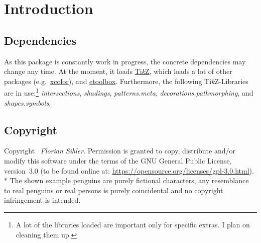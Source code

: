 \documentclass[parskip=half,english,numbers=noenddot,footnotes=nomultiple,oneside]{scrartcl}
\def\TikZ{Ti\textit{k}Z}
\begin{document}
\begin{center}
{}
\end{center}
\vfill\null

\clearpage\section{Introduction}
\subsection{Dependencies}

As this package is constantly work in progress, the concrete dependencies may change any time.
At the moment, it loads \href{https://www.ctan.org/pkg/pgf}{\TikZ}, which loads a lot of other packages (e.g.\ \href{https://www.ctan.org/pkg/xcolor}{xcolor}), and \href{https://www.ctan.org/pkg/etoolbox}{etoolbox}.
Furthermore, the following \TikZ-Libraries are in use:\footnote{A lot of the libraries loaded are important only for specific extras. I plan on cleaning them up.} \textit{intersections}, \textit{shadings}, \textit{patterns.meta}, \textit{decorations.pathmorphing}, and \textit{shapes.symbols}.

\subsection{Copyright}

Copyright \textcopyright\ \textit{Florian Sihler}. Permission is granted to copy, distribute and\slash or modify this software under the terms of the GNU General Public License, version~3.0 (to be found online at: \url{https://opensource.org/licenses/gpl-3.0.html}).\\*
The shown example penguins are purely fictional characters, any resemblance to real penguins or real persons is purely coincidental and no copyright infringement is intended.
\end{document}
